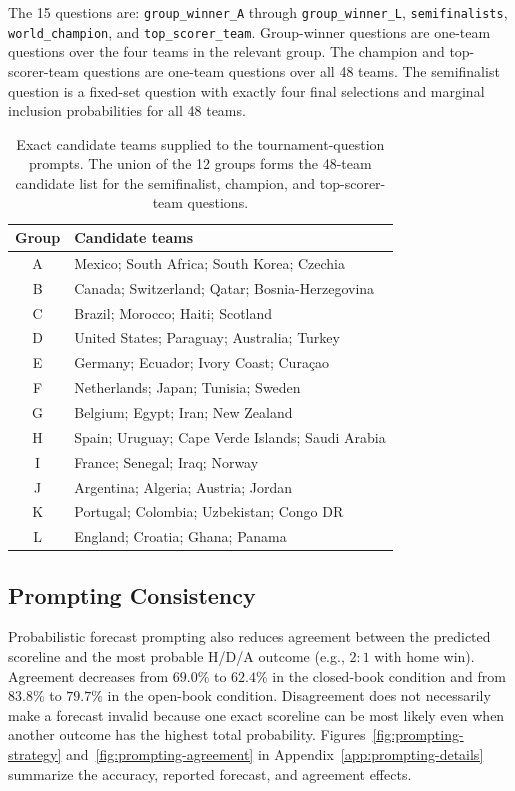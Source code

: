 \documentclass[sigconf,nonacm]{acmart}
\begin{document}
The 15 questions are: \texttt{group\_winner\_A} through \texttt{group\_winner\_L}, \texttt{semifinalists}, \texttt{world\_champion}, and \texttt{top\_scorer\_team}. Group-winner questions are one-team questions over the four teams in the relevant group. The champion and top-scorer-team questions are one-team questions over all 48 teams. The semifinalist question is a fixed-set question with exactly four final selections and marginal inclusion probabilities for all 48 teams.

\begin{table}[t]
  \centering
  \caption{Exact candidate teams supplied to the tournament-question prompts. The union of the 12 groups forms the 48-team candidate list for the semifinalist, champion, and top-scorer-team questions.}
  \label{tab:tournament-candidates}
  \small
  \begin{tabularx}{\textwidth}{@{}cX@{}}
    \toprule
    \textbf{Group} & \textbf{Candidate teams} \\
    \midrule
    A & Mexico; South Africa; South Korea; Czechia \\
    B & Canada; Switzerland; Qatar; Bosnia-Herzegovina \\
    C & Brazil; Morocco; Haiti; Scotland \\
    D & United States; Paraguay; Australia; Turkey \\
    E & Germany; Ecuador; Ivory Coast; Curaçao \\
    F & Netherlands; Japan; Tunisia; Sweden \\
    G & Belgium; Egypt; Iran; New Zealand \\
    H & Spain; Uruguay; Cape Verde Islands; Saudi Arabia \\
    I & France; Senegal; Iraq; Norway \\
    J & Argentina; Algeria; Austria; Jordan \\
    K & Portugal; Colombia; Uzbekistan; Congo DR \\
    L & England; Croatia; Ghana; Panama \\
    \bottomrule
  \end{tabularx}
\end{table}

\subsection{Prompting Consistency}
Probabilistic forecast prompting also reduces agreement between the predicted scoreline and the most probable H/D/A outcome (e.g., $2{:}1$ with home win). Agreement decreases from $69.0\%$ to $62.4\%$ in the closed-book condition and from $83.8\%$ to $79.7\%$ in the open-book condition. Disagreement does not necessarily make a forecast invalid because one exact scoreline can be most likely even when another outcome has the highest total probability. Figures~\ref{fig:prompting-strategy} and~\ref{fig:prompting-agreement} in Appendix~\ref{app:prompting-details} summarize the accuracy, reported forecast, and agreement effects.
\end{document}
